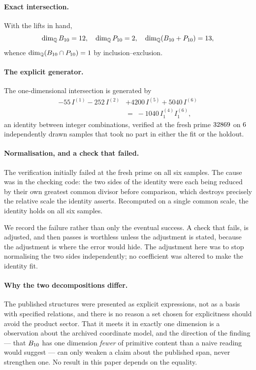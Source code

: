\paragraph{Exact intersection.}
With the lifts in hand,
\begin{equation}
\dim_{\mathbb{Q}} B_{10} = 12,\quad
\dim_{\mathbb{Q}} P_{10} = 2,\quad
\dim_{\mathbb{Q}}(B_{10} + P_{10}) = 13,
\end{equation}
whence $\dim_{\mathbb{Q}}(B_{10} \cap P_{10}) = 1$ by inclusion--exclusion.

\paragraph{The explicit generator.}
The one-dimensional intersection is generated by
\begin{equation}
\begin{split}
-55\,I^{(1)} - 252\,I^{(2)}& + 4200\,I^{(5)} + 5040\,I^{(6)} \\
 &=\; -1040\,I^{(4)}_1 I^{(6)}_1,
\end{split}
\end{equation}
an identity between integer combinations, verified at the fresh prime
$32869$ on $6$ independently drawn samples that took no
part in either the fit or the holdout.

\paragraph{Normalisation, and a check that failed.}
The verification initially failed at the fresh prime on all six samples. The
cause was in the checking code: the two sides of the identity were each being
reduced by their own greatest common divisor before comparison, which destroys
precisely the relative scale the identity asserts. Recomputed on a single common
scale, the identity holds on all six samples.

We record the failure rather than only the eventual success. A check that fails,
is adjusted, and then passes is worthless unless the adjustment is stated, because
the adjustment is where the error would hide. The adjustment here was to stop
normalising the two sides independently; no coefficient was altered to make the
identity fit.

\paragraph{Why the two decompositions differ.}
The published structures were presented as explicit expressions, not as a basis
with specified relations, and there is no reason a set chosen for explicitness
should avoid the product sector. That it meets it in exactly one dimension is a
observation about the archived coordinate model, and the direction of the
finding --- that $B_{10}$ has one dimension \emph{fewer} of primitive content than
a naive reading would suggest --- can only weaken a claim about the published
span, never strengthen one. No result in this paper depends on the equality.
